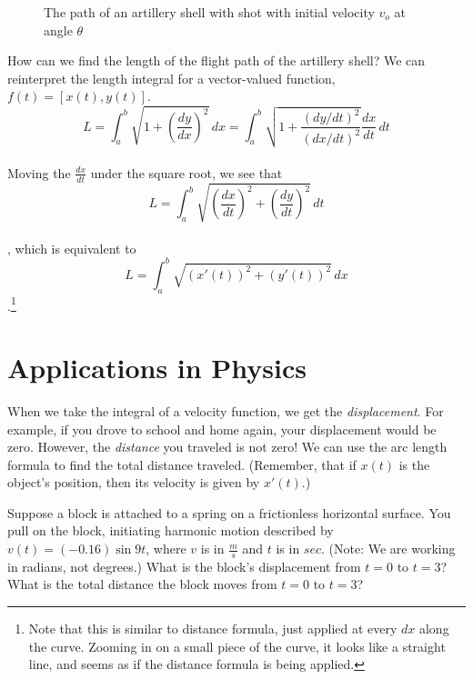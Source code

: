 \begin{figure}[htbp]
\centering
    \caption{The path of an artillery shell with shot with initial 
    velocity $v_o$ at angle $\theta$}
    \label{fig:shell}
\end{figure}  

How can we find the length of the flight path of the artillery shell? 
We can reinterpret the length integral for a vector-valued function, 
$f(t) = [x(t), y(t)]$.  
$$L = \int_a^b \sqrt{1+(\frac{dy}{dx})^2}\,dx = 
\int_a^b \sqrt{1 + \frac{(dy/dt)^2}{(dx/dt)^2}}\frac{dx}{dt}\,dt$$\\
Moving the $\frac{dx}{dt}$ under the square root, we see that
$$L = \int_a^b \sqrt{(\frac{dx}{dt})^2 + (\frac{dy}{dt})^2}\,dt$$\\,
which is equivalent to 
$$L = \int_a^b \sqrt{(x'(t))^2 + (y'(t))^2}\,dx$$.\footnote{Note that this is similar to distance formula, just applied at every $dx$ along the curve. Zooming in on a small piece of the curve, it looks like a straight line, and seems as if the distance formula is being applied.}

\section{Applications in Physics}
When we take the integral of a velocity function, we get the 
\textit{displacement}. For example, if you drove to school and home 
again, your displacement would be zero. However, the \textit{distance} 
you traveled is not zero! We can use the arc length formula to find 
the total distance traveled. (Remember, that if $x(t)$ is the object's 
position, then its velocity is given by $x'(t)$.)

Suppose a block is attached to a spring on a frictionless horizontal 
surface. You pull on the block, initiating harmonic motion described 
by $v(t) = (-0.16)\sin{9t}$, where $v$ is in $\frac{m}{s}$ and $t$ is 
in $sec$. (Note: We are working in radians, not degrees.) What is the 
block's displacement from $t = 0$ to $t = 3$? What is the total 
distance the block moves from $t = 0$ to $t = 3$? 

